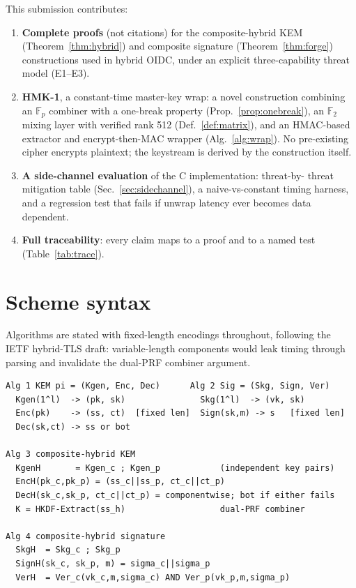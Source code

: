 \documentclass[11pt,a4paper]{article}
\theoremstyle{remark}
\newcommand{\F}{\mathbb{F}}
\begin{document}
This submission contributes:
\begin{enumerate}
  \item \textbf{Complete proofs} (not citations) for the composite-hybrid KEM
        (Theorem~\ref{thm:hybrid}) and composite signature
        (Theorem~\ref{thm:forge}) constructions used in hybrid OIDC, under an
        explicit three-capability threat model (E1--E3).
  \item \textbf{HMK-1}, a constant-time master-key wrap: a novel construction
        combining an $\F_p$ combiner with a one-break property
        (Prop.~\ref{prop:onebreak}), an $\F_2$ mixing layer with verified
        rank 512 (Def.~\ref{def:matrix}), and an HMAC-based extractor and
        encrypt-then-MAC wrapper (Alg.~\ref{alg:wrap}). No pre-existing cipher
        encrypts plaintext; the keystream is derived by the construction itself.
  \item \textbf{A side-channel evaluation} of the C implementation: threat-by-
        threat mitigation table (Sec.~\ref{sec:sidechannel}), a naive-vs-constant
        timing harness, and a regression test that fails if unwrap latency ever
        becomes data dependent.
  \item \textbf{Full traceability}: every claim maps to a proof and to a named
        test (Table~\ref{tab:trace}).
\end{enumerate}

\section{Scheme syntax}
Algorithms are stated with fixed-length encodings throughout, following the
IETF hybrid-TLS draft: variable-length components would
leak timing through parsing and invalidate the dual-PRF combiner argument.

\begin{lstlisting}[caption={Component syntax: Alg 1--2 (components) and Alg 3--4 (composite constructions)},label={alg:syntax}]
Alg 1 KEM pi = (Kgen, Enc, Dec)      Alg 2 Sig = (Skg, Sign, Ver)
  Kgen(1^l)  -> (pk, sk)               Skg(1^l)  -> (vk, sk)
  Enc(pk)    -> (ss, ct)  [fixed len]  Sign(sk,m) -> s   [fixed len]
  Dec(sk,ct) -> ss or bot

Alg 3 composite-hybrid KEM
  KgenH       = Kgen_c ; Kgen_p            (independent key pairs)
  EncH(pk_c,pk_p) = (ss_c||ss_p, ct_c||ct_p)
  DecH(sk_c,sk_p, ct_c||ct_p) = componentwise; bot if either fails
  K = HKDF-Extract(ss_h)                   dual-PRF combiner

Alg 4 composite-hybrid signature
  SkgH  = Skg_c ; Skg_p
  SignH(sk_c, sk_p, m) = sigma_c||sigma_p
  VerH  = Ver_c(vk_c,m,sigma_c) AND Ver_p(vk_p,m,sigma_p)
\end{lstlisting}
\end{document}
